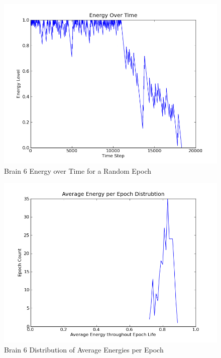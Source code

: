 \documentclass[a4paper,11pt]{article}
\begin{document}
\begin{figure}
\begin{center}
  \includegraphics[scale=1.0]{img/brain6/1355176281-0.250000-EvT.png}
  \caption{Brain 6 Energy over Time for a Random Epoch}
  \label{fig:b6evt}
\end{center}
\end{figure}

\begin{figure}
\begin{center}
  \includegraphics[scale=1.0]{img/brain6/avgenergyGauss-0.05.png}
  \caption{Brain 6 Distribution of Average Energies per Epoch}
  \label{fig:b6avgenergy}
\end{center}
\end{figure}
\end{document}
